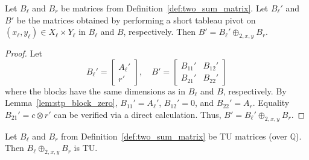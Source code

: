 \begin{lemma}\label{lem:two_sum_pivot}
    Let $B_{\ell}$ and $B_{r}$ be matrices from Definition~\ref{def:two_sum_matrix}. Let $B_{\ell}'$ and $B'$ be the matrices obtained by performing a short tableau pivot on $(x_{\ell}, y_{\ell}) \in X_{\ell} \times Y_{\ell}$ in $B_{\ell}$ and $B$, respectively. Then $B' = B_{\ell}' \oplus_{2, x, y} B_{r}$.
\end{lemma}

\begin{proof}
    Let
    \[
        B_{\ell}' = \begin{bmatrix} A_{\ell}' \\ r' \end{bmatrix}, \quad
        B' = \begin{bmatrix} B_{11}' & B_{12}' \\ B_{21}' & B_{22}' \end{bmatrix}
    \]
    where the blocks have the same dimensions as in $B_{\ell}$ and $B$, respectively. By Lemma~\ref{lem:stp_block_zero}, $B_{11}' = A_{\ell}'$, $B_{12}' = 0$, and $B_{22}' = A_{r}$. Equality $B_{21}' = c \otimes r'$ can be verified via a direct calculation. Thus, $B' = B_{\ell}' \oplus_{2, x, y} B_{r}$.
\end{proof}

\begin{lemma}\label{lem:two_sum_tu}
    Let $B_{\ell}$ and $B_{r}$ from Definition~\ref{def:two_sum_matrix} be TU matrices (over $\mathbb{Q}$). Then $B_{\ell} \oplus_{2, x, y} B_{r}$ is TU.
\end{lemma}

